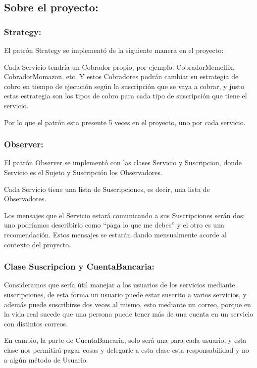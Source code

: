 \documentclass{article}
\begin{document}
\subsection*{Sobre el proyecto:}

\subsubsection*{Strategy:}

El patrón Strategy se implementó de la siguiente manera en el proyecto:

Cada Servicio tendría un Cobrador propio, por ejemplo: CobradorMemeflix,
CobradorMomazon, etc. Y estos Cobradores podrán cambiar su estrategia de
cobro en tiempo de ejecución según la suscripción que se vaya a cobrar,
y justo estas estrategia son los tipos de cobro para cada tipo de suscripción
que tiene el servicio.

Por lo que el patrón esta presente 5 veces en el proyecto, uno por cada servicio.

\subsubsection*{Observer:}

El patrón Observer se implementó con las clases Servicio y Suscripcion, donde Servicio es el Sujeto y Suscripción los Observadores.

Cada Servicio tiene una lista de Suscripciones, es decir, una lista de Observadores.

Los mensajes que el Servicio estará comunicando a sus Suscripciones serán dos: uno podríamos describirlo como “paga lo que me debes” y el otro es una recomendación. Estos mensajes se estarán dando mensualmente acorde al contexto del proyecto.

\subsubsection*{Clase Suscripcion y CuentaBancaria:}

Consideramos que sería útil manejar a los usuarios de los servicios mediante suscripciones, de esta forma un usuario puede estar suscrito a varios servicios, y además puede suscribirse dos veces al mismo, esto mediante un correo, porque en la vida real sucede que una persona puede tener más de una cuenta en un servicio con distintos correos.

En cambio, la parte de CuentaBancaria, solo será una para cada usuario, y esta clase nos permitirá pagar cosas y delegarle a esta clase esta responsabilidad y no a algún método de Usuario.
\end{document}
